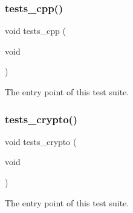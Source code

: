 \subsubsection{\texorpdfstring{tests\+\_\+cpp()}{tests\_cpp()}}
{\footnotesize\ttfamily void tests\+\_\+cpp (\begin{DoxyParamCaption}\item[{void}]{ }\end{DoxyParamCaption})}



The entry point of this test suite. 

\mbox{\label{group__unittests_ga910f269e2fc5cd756415b49feb82eaca}} 
\subsubsection{\texorpdfstring{tests\+\_\+crypto()}{tests\_crypto()}}
{\footnotesize\ttfamily void tests\+\_\+crypto (\begin{DoxyParamCaption}\item[{void}]{ }\end{DoxyParamCaption})}



The entry point of this test suite. 

